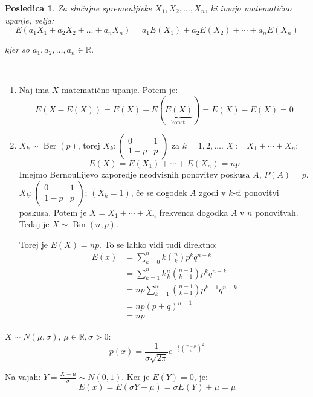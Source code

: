 \documentclass[12pt]{book}
\theoremstyle{definition}
\theoremstyle{plain}
\theoremstyle{plain}
\theoremstyle{plain}
\newtheorem{posledica}{Posledica}
\theoremstyle{remark}
\begin{document}
\begin{posledica}
    Za slučajne spremenljivke $X_1, X_2, \ldots, X_n$, ki imajo matematično upanje, velja: 
    $$
    E\left(a_1 X_1+a_2 X_2+\ldots+a_n X_n\right)=a_1 E\left(X_1\right)+a_2 E \left(X_2\right)+\cdots+a_n E\left(X_n\right)
    $$

    kjer so $a_1, a_2, \ldots, a_n \in \mathbb{R}$.
\end{posledica}

\begin{zgled}
    ~

    \begin{enumerate}
        \item Naj ima $X$ matematično upanje. Potem je: 
        $$
        E(X-E(X))=E(X)-E(\underbrace{E(X)}_{\text{konst.}})=E(X)-E(X)=0
        $$
        \item $X_k \sim \operatorname{Ber}(p)$, torej $X_k:\left(\begin{array}{cc}0 & 1 \\1-p & p\end{array}\right)$ za $k=1, 2, \ldots$. $X:=X_1+ \cdots +X_n$:
        $$
        E(X)=E\left(X_1\right)+\cdots+E\left(X_n\right)=n p
        $$
        Imejmo Bernoullijevo zaporedje neodvisnih ponovitev poskusa $A$, $P(A)=p$. $X_k:\left(\begin{array}{cc}0 & 1 \\1-p & p\end{array}\right)$; $(X_k=1)$, če se dogodek $A$ zgodi v $k$-ti ponovitvi poskusa. Potem je $X=X_1+\cdots+X_n$ frekvenca dogodka $A$ v $n$ ponovitvah. Tedaj je $X \sim \operatorname{Bin}(n,p)$.

        Torej je $E(X)=n p$. To se lahko vidi tudi direktno: 
        $$
        \begin{aligned}
            E(x)&=\sum_{k=0}^n k \binom{n}{k} p^k q^{n-k} \\
            &=\sum_{k=1}^n k  \frac{n}{k} \binom{n-1}{k-1} p^k q^{n-k} \\
            &=np \sum_{k=1}^n\binom{n-1}{k-1} p^{k-1} q^{n-k} \\
            &=n p (p+q)^{n-1} \\
            &= np
        \end{aligned}
        $$
    \end{enumerate}
\end{zgled}

\begin{zgled}
    $X \sim N(\mu, \sigma)$, $\mu \in \mathbb{R}, \sigma>0$:
    $$
    p(x)=\frac{1}{\sigma \sqrt{2 \pi}} e^{-\frac{1}{2}\left(\frac{x-\mu}{\sigma}\right)^2}
    $$

    Na vajah: $Y=\frac{X-\mu}{\sigma} \sim N(0,1)$. Ker je $E(Y) = 0$, je:
    $$
    E(x)=E(\sigma Y+\mu) = \sigma E(Y)+\mu=\mu
    $$
\end{zgled}
\end{document}
